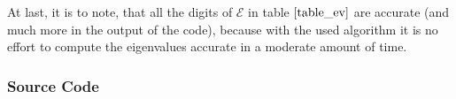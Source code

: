 \documentclass[12pt, a4paper]{article}
\newenvironment{code}{\captionsetup{type=listing}}{}
\begin{document}
  \noindent
  At last, it is to note, that all the digits of $\mathcal{E}$ in table $\ref{table_ev}$ are accurate (and much more in the output of the code), because with the used algorithm it is no effort to compute the eigenvalues accurate in a moderate amount of time.

  \subsubsection*{Source Code}
  

  \begin{code}
    \inputminted{python}{numerov.py}
  \end{code}
  \begin{code}
  	\inputminted{python}{problem1.py}
  \end{code}
  \begin{code}
    \inputminted{python}{problem2a.py}
  \end{code}
  \begin{code}
    \inputminted{python}{problem2b.py}
  \end{code}
\end{document}
